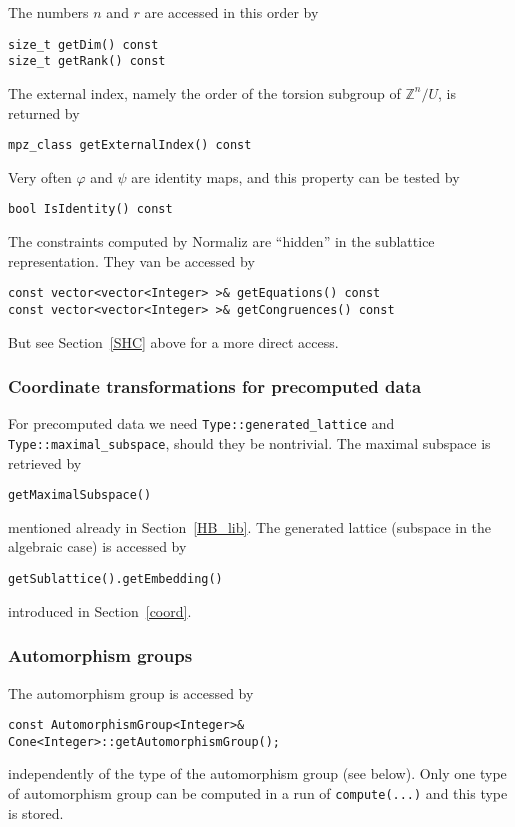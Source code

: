 \documentclass[12pt,a4paper]{scrartcl}
\theoremstyle{definition}
\let\phi=\varphi
\def\ZZ{{\mathbb Z}}
\begin{document}
\begin{small}
The numbers $n$ and $r$ are accessed in this order by
\begin{Verbatim}
size_t getDim() const
size_t getRank() const
\end{Verbatim}
The external index, namely the order of the torsion subgroup of $\ZZ^n/U$, is returned by
\begin{Verbatim}
mpz_class getExternalIndex() const
\end{Verbatim}
Very often $\phi$ and $\psi$ are identity maps, and this property can be tested by
\begin{Verbatim}
bool IsIdentity() const
\end{Verbatim}
The constraints computed by Normaliz are ``hidden'' in the sublattice representation. They van be accessed by
\begin{Verbatim}
const vector<vector<Integer> >& getEquations() const
const vector<vector<Integer> >& getCongruences() const
\end{Verbatim}

But see Section~\ref{SHC} above for a more direct access.

\subsubsection{Coordinate transformations for precomputed data}\label{coord_pre}

For precomputed data we need \verb|Type::generated_lattice| and \verb|Type::maximal_subspace|, should they be nontrivial. The maximal subspace is retrieved by
\begin{Verbatim}
getMaximalSubspace()
\end{Verbatim}
mentioned already in Section~\ref{HB_lib}. The generated lattice (subspace in the algebraic case) is accessed by
\begin{Verbatim}
getSublattice().getEmbedding()
\end{Verbatim}
introduced in Section~\ref{coord}.

\subsubsection{Automorphism groups}

The automorphism group is accessed by

\begin{Verbatim}
const AutomorphismGroup<Integer>& Cone<Integer>::getAutomorphismGroup();
\end{Verbatim}
independently of the type of the automorphism group (see below). Only one type of automorphism group can be computed in a run of \verb|compute(...)| and this type is stored.


\end{small}
\end{document}
